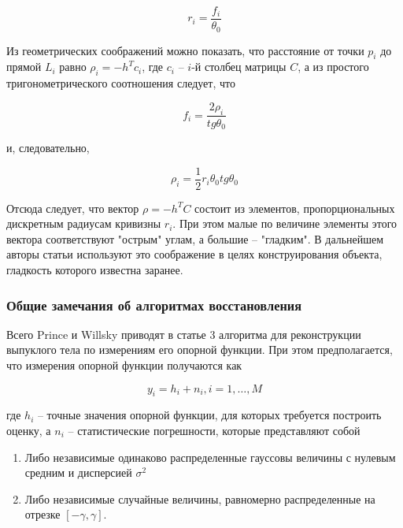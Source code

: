 \documentclass[a4paper, 12pt, titlepage]{article}
\theoremstyle{definition}
\theoremstyle{plain}
\begin{document}
\begin{equation}
r_{i} = \frac{f_{i}}{\theta_{0}}
\end{equation}

Из геометрических соображений можно показать, что расстояние от точки $p_{i}$
до прямой $L_{i}$ равно $\rho_{i} = -h^{T} c_{i}$, где $c_{i}$ -- $i$-й столбец
матрицы $C$, а из простого тригонометрического соотношения следует, что

\begin{equation}
f_{i} = \frac{2 \rho_{i}}{tg \theta_{0}}
\end{equation}

и, следовательно,

\begin{equation}
\rho_{i} = \frac{1}{2} r_{i} \theta_{0} tg \theta_{0}
\end{equation}

Отсюда следует, что вектор $\rho = - h^{T} C$ состоит из элементов,
пропорциональных дискретным радиусам кривизны $r_{i}$. При этом малые по
величине элементы этого вектора соответствуют "острым" углам, а большие --
"гладким". В дальнейшем авторы статьи используют это соображение в целях
конструирования объекта, гладкость которого известна заранее.

\subsubsection{Общие замечания об алгоритмах восстановления}
\label{sec:history/PrinceW90/algo-common}

Всего Prince и Willsky приводят в статье 3 алгоритма для реконструкции выпуклого
тела по измерениям его опорной функции. При этом предполагается, что измерения
опорной функции получаются как

\begin{equation}
y_{i} = h_{i} + n_{i}, i = 1, \ldots, M
\end{equation}

где $h_{i}$ -- точные значения опорной функции, для которых требуется построить
оценку, а $n_{i}$ -- статистические погрешности, которые представляют собой

\begin{enumerate}
 \item Либо независимые одинаково распределенные гауссовы величины с нулевым
 средним и дисперсией $\sigma^{2}$
 \item Либо независимые случайные величины, равномерно распределенные на отрезке
 $[ - \gamma, \gamma]$.
\end{enumerate}
\end{document}
